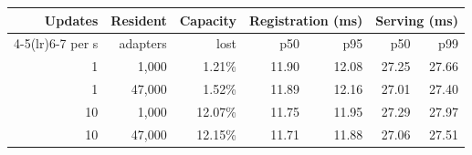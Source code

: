 \begin{tabular}{@{}rrrrrrr@{}}
\toprule
Updates & Resident & Capacity & \multicolumn{2}{c}{Registration (ms)} & \multicolumn{2}{c}{Serving (ms)} \\
\cmidrule(lr){4-5}\cmidrule(lr){6-7}
per s & adapters & lost & p50 & p95 & p50 & p99 \\
\midrule
1 & 1{,}000 & 1.21\% & 11.90 & 12.08 & 27.25 & 27.66 \\
1 & 47{,}000 & 1.52\% & 11.89 & 12.16 & 27.01 & 27.40 \\
10 & 1{,}000 & 12.07\% & 11.75 & 11.95 & 27.29 & 27.97 \\
10 & 47{,}000 & 12.15\% & 11.71 & 11.88 & 27.06 & 27.51 \\
\bottomrule
\end{tabular}
